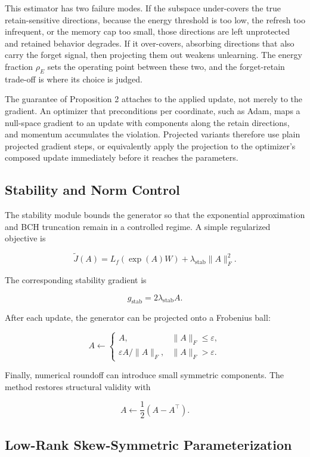 \documentclass[
]{article}
\begin{document}
This estimator has two failure modes. If the subspace under-covers the true retain-sensitive directions, because the energy threshold is too low, the refresh too infrequent, or the memory cap too small, those directions are left unprotected and retained behavior degrades. If it over-covers, absorbing directions that also carry the forget signal, then projecting them out weakens unlearning. The energy fraction \(\rho_E\) sets the operating point between these two, and the forget-retain trade-off is where its choice is judged.

The guarantee of Proposition 2 attaches to the applied update, not merely to the gradient. An optimizer that preconditions per coordinate, such as Adam, maps a null-space gradient to an update with components along the retain directions, and momentum accumulates the violation. Projected variants therefore use plain projected gradient steps, or equivalently apply the projection to the optimizer's composed update immediately before it reaches the parameters.

\subsection{Stability and Norm Control}\label{stability-and-norm-control}

The stability module bounds the generator so that the exponential approximation and BCH truncation remain in a controlled regime. A simple regularized objective is

\[
\widetilde{J}(A)=L_f(\exp(A)W)+\lambda_{\mathrm{stab}}\|A\|_F^2.
\]

The corresponding stability gradient is

\[
g_{\mathrm{stab}}=2\lambda_{\mathrm{stab}}A.
\]

After each update, the generator can be projected onto a Frobenius ball:

\[
A\leftarrow
\begin{cases}
A, & \|A\|_F\leq \varepsilon,\\
\varepsilon A/\|A\|_F, & \|A\|_F>\varepsilon.
\end{cases}
\]

Finally, numerical roundoff can introduce small symmetric components. The method restores structural validity with

\[
A\leftarrow \frac{1}{2}(A-A^\top).
\]

\subsection{Low-Rank Skew-Symmetric Parameterization}\label{low-rank-skew-symmetric-parameterization}
\end{document}
